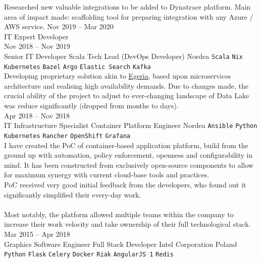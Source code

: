 \documentclass[9pt]{style/developercv}
\begin{document}
\begin{entrylist}
{            Researched new valuable integrations to be added to Dynatrace platform. 
            Main area of impact made: scaffolding tool for preparing integration with any
            Azure / AWS service.
      }
    \entry
        {Nov 2019 -- Mar 2020\\\footnotesize{IT Expert Developer}
        \\Nov 2018 -- Nov 2019\\\footnotesize{Senior IT Developer}}
        {Scala Tech Lead (DevOps Developer)}
        {Nordea}
        {
            \texttt{Scala}\slashsep
            \texttt{Nix}\slashsep
            \texttt{Kubernetes}\slashsep
            \texttt{Bazel}\slashsep
            \texttt{Argo}\slashsep
            \texttt{Elastic Search}\slashsep
            \texttt{Kafka}\\

            Developing proprietary solution akin to 
            \href{https://egeria.odpi.org}{Egeria}, based upon microservices 
            architecture and realising high availability demands. Due to changes made, the crucial ability of 
            the project to adjust to ever-changing landscape of Data Lake was
            reduce significantly (dropped from months to days). \\
        }
    \entry
        {Apr 2018 -- Nov 2018\\\footnotesize{IT Infrastructure Specialist}}
        {Container Platform Engineer}
        {Nordea}
        {
            \texttt{Ansible}\slashsep
            \texttt{Python}\slashsep
            \texttt{Kubernetes}\slashsep
            \texttt{Rancher}\slashsep
            \texttt{OpenShift}\slashsep
            \texttt{Grafana}\\

            I have created the PoC of container-based application platform, build 
            from the ground up with automation, policy enforcement, 
            openness and configurability in mind. 
            It has been constructed from exclusively open-source components to
            allow for maximum synergy with current cloud-base 
            tools and practices. \\
            PoC received very good initial feedback from the developers, 
            who found out it significantly simplified their every-day work.\\ \\
            Most notably, the platform allowed multiple teams within the company
            to increase their work velocity and take ownership of their full technological
            stack.
        }
    \entry
        {Mar 2015 -- Apr 2018\\\footnotesize{Graphics Software Engineer}}
        {Full Stack Developer}
        {Intel Corporation Poland}
        {
            \texttt{Python}\slashsep
            \texttt{Flask}\slashsep
            \texttt{Celery}\slashsep
            \texttt{Docker}\slashsep
            \texttt{Riak}\slashsep
            \texttt{AngularJS 1}\slashsep
            \texttt{Redis}\\

}
\end{entrylist}
\end{document}

